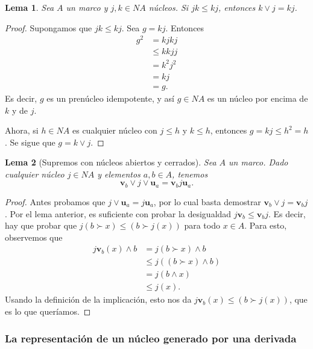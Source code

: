 \documentclass[12pt,letterpaper,titlepage]{article}
\newtheorem{lemma}{Lema}
\theoremstyle{definition}
\renewcommand\sup{\vee}
\renewcommand\inf{\wedge}
\newcommand\unuc[1]{\mathbf u_{#1}}
\newcommand\vnuc[1]{\mathbf v_{#1}}
\newcommand\<{\langle}
\renewcommand\>{\rangle}
\begin{document}
\begin{lemma}
  Sea $A$ un marco y $j,k\in NA$ núcleos.
  Si $jk\leq kj$, entonces $k\sup j = kj$.
\end{lemma}
\begin{proof}
  Supongamos que $jk\leq kj$.
  Sea $g=kj$.
  Entonces
  \begin{align*}
    g^2
    &= kjkj \\
    &\leq kkjj \\
    &= k^2j^2 \\
    &= kj \\
    &= g.
  \end{align*}
  Es decir, $g$ es un prenúcleo idempotente, y así $g\in NA$
  es un núcleo por encima de $k$ y de $j$.

  Ahora, si $h\in NA$ es cualquier núcleo con $j\leq h$ y $k\leq
  h$, entonces $g=kj\leq h^2=h$.
  Se sigue que $g=k\sup j$.
\end{proof}

\begin{lemma}[Supremos con núcleos abiertos y cerrados]
    \label{lem:sup-ab-cerr}
  Sea $A$ un marco.
  Dado cualquier núcleo $j\in NA$ y elementos $a,b\in A$, tenemos
  \[
    \vnuc b \sup j \sup \unuc a = \vnuc b j \unuc a
  .\]
\end{lemma}
\begin{proof}
    Antes probamos que $j\sup\unuc a = j\unuc a$,
    por lo cual basta demostrar $\vnuc b \sup j = \vnuc b j$.
  Por el lema anterior, es suficiente con probar la desigualdad
  $j\vnuc b \leq \vnuc b j$.
  Es decir, hay que probar que $j(b\succ x) \leq (b\succ j(x))$
  para todo $x\in A$.
  Para esto, observemos que
  \begin{align*}
    j\vnuc b (x) \inf b
    &= j(b\succ x) \inf b \\
    &\leq j((b\succ x)\inf b) \\
    &= j(b\inf x) \\
    &\leq j(x).
  \end{align*}
  Usando la definición de la implicación, esto nos da $j\vnuc
  b(x) \leq (b\succ j(x))$, que es lo que queríamos.
\end{proof}


\subsubsection{La representación de un núcleo generado por una derivada}
\end{document}
